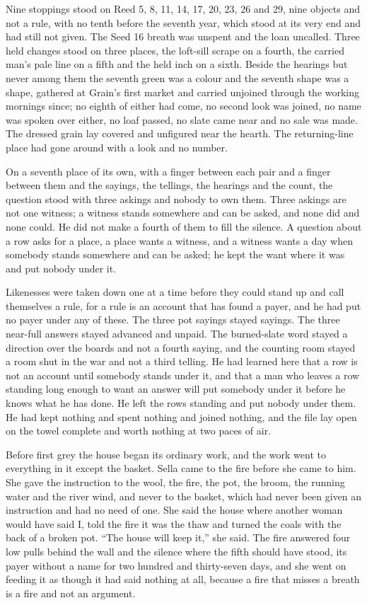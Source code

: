 Nine stoppings stood on Reed 5, 8, 11, 14, 17, 20, 23, 26 and 29, nine objects and not a rule, with no tenth before the seventh year, which stood at its very end and had still not given. The Seed 16 breath was unspent and the loan uncalled. Three held changes stood on three places, the loft-sill scrape on a fourth, the carried man's pale line on a fifth and the held inch on a sixth. Beside the hearings but never among them the seventh green was a colour and the seventh shape was a shape, gathered at Grain's first market and carried unjoined through the working mornings since; no eighth of either had come, no second look was joined, no name was spoken over either, no loaf passed, no slate came near and no sale was made. The dressed grain lay covered and unfigured near the hearth. The returning-line place had gone around with a look and no number.

On a seventh place of its own, with a finger between each pair and a finger between them and the sayings, the tellings, the hearings and the count, the question stood with three askings and nobody to own them. Three askings are not one witness; a witness stands somewhere and can be asked, and none did and none could. He did not make a fourth of them to fill the silence. A question about a row asks for a place, a place wants a witness, and a witness wants a day when somebody stands somewhere and can be asked; he kept the want where it was and put nobody under it.

Likenesses were taken down one at a time before they could stand up and call themselves a rule, for a rule is an account that has found a payer, and he had put no payer under any of these. The three pot sayings stayed sayings. The three near-full answers stayed advanced and unpaid. The burned-slate word stayed a direction over the boards and not a fourth saying, and the counting room stayed a room shut in the war and not a third telling. He had learned here that a row is not an account until somebody stands under it, and that a man who leaves a row standing long enough to want an answer will put somebody under it before he knows what he has done. He left the rows standing and put nobody under them. He had kept nothing and spent nothing and joined nothing, and the file lay open on the towel complete and worth nothing at two paces of air.

\scenebreak

Before first grey the house began its ordinary work, and the work went to everything in it except the basket. Sella came to the fire before she came to him. She gave the instruction to the wool, the fire, the pot, the broom, the running water and the river wind, and never to the basket, which had never been given an instruction and had no need of one. She said the house where another woman would have said I, told the fire it was the thaw and turned the coals with the back of a broken pot. “The house will keep it,” she said. The fire answered four low pulls behind the wall and the silence where the fifth should have stood, its payer without a name for two hundred and thirty-seven days, and she went on feeding it as though it had said nothing at all, because a fire that misses a breath is a fire and not an argument.

